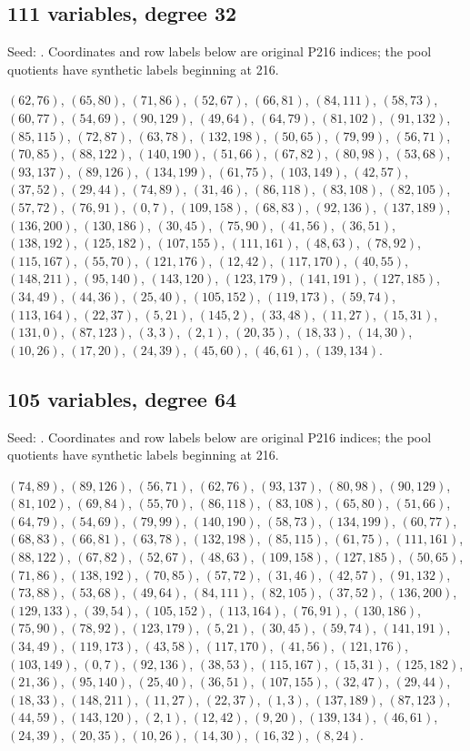 \subsection*{111 variables, degree 32}
Seed: . Coordinates and row labels below are original P216 indices; the pool quotients have synthetic labels beginning at 216.
{\small\raggedright
$(62,76)$, $(65,80)$, $(71,86)$, $(52,67)$, $(66,81)$, $(84,111)$, $(58,73)$, $(60,77)$, $(54,69)$, $(90,129)$, $(49,64)$, $(64,79)$, $(81,102)$, $(91,132)$, $(85,115)$, $(72,87)$, $(63,78)$, $(132,198)$, $(50,65)$, $(79,99)$, $(56,71)$, $(70,85)$, $(88,122)$, $(140,190)$, $(51,66)$, $(67,82)$, $(80,98)$, $(53,68)$, $(93,137)$, $(89,126)$, $(134,199)$, $(61,75)$, $(103,149)$, $(42,57)$, $(37,52)$, $(29,44)$, $(74,89)$, $(31,46)$, $(86,118)$, $(83,108)$, $(82,105)$, $(57,72)$, $(76,91)$, $(0,7)$, $(109,158)$, $(68,83)$, $(92,136)$, $(137,189)$, $(136,200)$, $(130,186)$, $(30,45)$, $(75,90)$, $(41,56)$, $(36,51)$, $(138,192)$, $(125,182)$, $(107,155)$, $(111,161)$, $(48,63)$, $(78,92)$, $(115,167)$, $(55,70)$, $(121,176)$, $(12,42)$, $(117,170)$, $(40,55)$, $(148,211)$, $(95,140)$, $(143,120)$, $(123,179)$, $(141,191)$, $(127,185)$, $(34,49)$, $(44,36)$, $(25,40)$, $(105,152)$, $(119,173)$, $(59,74)$, $(113,164)$, $(22,37)$, $(5,21)$, $(145,2)$, $(33,48)$, $(11,27)$, $(15,31)$, $(131,0)$, $(87,123)$, $(3,3)$, $(2,1)$, $(20,35)$, $(18,33)$, $(14,30)$, $(10,26)$, $(17,20)$, $(24,39)$, $(45,60)$, $(46,61)$, $(139,134)$.\par}

\subsection*{105 variables, degree 64}
Seed: . Coordinates and row labels below are original P216 indices; the pool quotients have synthetic labels beginning at 216.
{\small\raggedright
$(74,89)$, $(89,126)$, $(56,71)$, $(62,76)$, $(93,137)$, $(80,98)$, $(90,129)$, $(81,102)$, $(69,84)$, $(55,70)$, $(86,118)$, $(83,108)$, $(65,80)$, $(51,66)$, $(64,79)$, $(54,69)$, $(79,99)$, $(140,190)$, $(58,73)$, $(134,199)$, $(60,77)$, $(68,83)$, $(66,81)$, $(63,78)$, $(132,198)$, $(85,115)$, $(61,75)$, $(111,161)$, $(88,122)$, $(67,82)$, $(52,67)$, $(48,63)$, $(109,158)$, $(127,185)$, $(50,65)$, $(71,86)$, $(138,192)$, $(70,85)$, $(57,72)$, $(31,46)$, $(42,57)$, $(91,132)$, $(73,88)$, $(53,68)$, $(49,64)$, $(84,111)$, $(82,105)$, $(37,52)$, $(136,200)$, $(129,133)$, $(39,54)$, $(105,152)$, $(113,164)$, $(76,91)$, $(130,186)$, $(75,90)$, $(78,92)$, $(123,179)$, $(5,21)$, $(30,45)$, $(59,74)$, $(141,191)$, $(34,49)$, $(119,173)$, $(43,58)$, $(117,170)$, $(41,56)$, $(121,176)$, $(103,149)$, $(0,7)$, $(92,136)$, $(38,53)$, $(115,167)$, $(15,31)$, $(125,182)$, $(21,36)$, $(95,140)$, $(25,40)$, $(36,51)$, $(107,155)$, $(32,47)$, $(29,44)$, $(18,33)$, $(148,211)$, $(11,27)$, $(22,37)$, $(1,3)$, $(137,189)$, $(87,123)$, $(44,59)$, $(143,120)$, $(2,1)$, $(12,42)$, $(9,20)$, $(139,134)$, $(46,61)$, $(24,39)$, $(20,35)$, $(10,26)$, $(14,30)$, $(16,32)$, $(8,24)$.\par}

